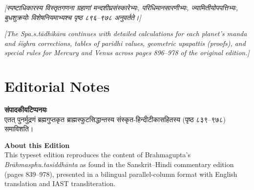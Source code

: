 \documentclass[11pt,a4paper]{book}
\newcommand{\dev}[1]{{\devanagarifont #1}}
\newcommand{\bilingual}[2]{%
  \par\vspace{0.6em}%
  \noindent\begin{minipage}[t]{0.48\textwidth}
    \RaggedRight
    #1%
  \end{minipage}%
  \hfill
  \begin{minipage}[t]{0.48\textwidth}
    \RaggedRight
    #2%
  \end{minipage}%
  \par\vspace{0.6em}%
}
\begin{document}
\bilingual{%
\textit{[स्पष्टाधिकारस्य विस्तृतगणना ग्रहाणां मन्दशीघ्रसंस्कारेभ्यः, परिधिमानसारणीभ्यः, ज्यामितीयोपपत्तिभ्यः, बुधशुक्रयोः विशेषनियमाभ्यश्च पृष्ठ ८९६--९७८ अनुवर्तते।]}
}{%
\textit{[The Spa.s.tādhikāra continues with detailed calculations for each planet's \textit{manda} and \textit{śīghra} corrections, tables of \textit{paridhi} values, geometric \textit{upapatti}s (proofs), and special rules for Mercury and Venus across pages 896--978 of the original edition.]}
}

\clearpage

\appendix
\chapter*{Editorial Notes}

\bilingual{%
\textbf{\dev{संपादकीयटिप्पनयः}}\\[0.3em]
एतत्‌ पुनर्मुद्रणं ब्रह्मगुप्तकृत ब्राह्मस्फुटसिद्धान्तस्य संस्कृत-हिन्दीटीकासहितस्य (पृष्ठ ८३९--९७८) समाविशति।
}{%
\textbf{About this Edition}\\[0.3em]
This typeset edition reproduces the content of Brahmagupta's \textit{Brāhmasphu.tasiddhānta} as found in the Sanskrit--Hindi commentary edition (pages 839--978), presented in a bilingual parallel-column format with English translation and IAST transliteration.
}

\vspace{1em}
\end{document}
